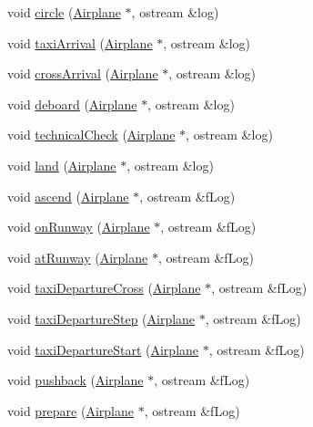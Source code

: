 \begin{DoxyCompactItemize}
\item 
void \hyperlink{classSystem_ad9eb38b77b90b0c42e18ee11d4e3b5f5}{circle} (\hyperlink{classAirplane}{Airplane} $\ast$, ostream \&log)
\item 
void \hyperlink{classSystem_a317a2279de25d632c07d864e36bd6b23}{taxi\+Arrival} (\hyperlink{classAirplane}{Airplane} $\ast$, ostream \&log)
\item 
void \hyperlink{classSystem_a26b7e33c42eaafd089f44cc37057e733}{cross\+Arrival} (\hyperlink{classAirplane}{Airplane} $\ast$, ostream \&log)
\item 
void \hyperlink{classSystem_ac9dbb8cb01b11e26732429ecfb15229a}{deboard} (\hyperlink{classAirplane}{Airplane} $\ast$, ostream \&log)
\item 
void \hyperlink{classSystem_a557889a54b170fa287156d2e7c7069dc}{technical\+Check} (\hyperlink{classAirplane}{Airplane} $\ast$, ostream \&log)
\item 
void \hyperlink{classSystem_a3524fb6d3f3065ec97a2c12ca521476e}{land} (\hyperlink{classAirplane}{Airplane} $\ast$, ostream \&log)
\item 
void \hyperlink{classSystem_abbd3230d357f0b897ff4d4f02774b93e}{ascend} (\hyperlink{classAirplane}{Airplane} $\ast$, ostream \&f\+Log)
\item 
void \hyperlink{classSystem_a0c208fdb58a50616cbb8a4dddff428a4}{on\+Runway} (\hyperlink{classAirplane}{Airplane} $\ast$, ostream \&f\+Log)
\item 
void \hyperlink{classSystem_a22dbdbc5b3de80899f08d76fb5afee41}{at\+Runway} (\hyperlink{classAirplane}{Airplane} $\ast$, ostream \&f\+Log)
\item 
void \hyperlink{classSystem_acfbbb087336c9be6c5d3bff48bf990c0}{taxi\+Departure\+Cross} (\hyperlink{classAirplane}{Airplane} $\ast$, ostream \&f\+Log)
\item 
void \hyperlink{classSystem_a90a664dab1f135035f77bb630e5336d0}{taxi\+Departure\+Step} (\hyperlink{classAirplane}{Airplane} $\ast$, ostream \&f\+Log)
\item 
void \hyperlink{classSystem_ad00d2b047b6b3a93681b37045c4f2142}{taxi\+Departure\+Start} (\hyperlink{classAirplane}{Airplane} $\ast$, ostream \&f\+Log)
\item 
void \hyperlink{classSystem_aaf7ec97fc1f23a7aa506fd44581e0f48}{pushback} (\hyperlink{classAirplane}{Airplane} $\ast$, ostream \&f\+Log)
\item 
void \hyperlink{classSystem_a74fc45ac036c70cc5afe021429aa5878}{prepare} (\hyperlink{classAirplane}{Airplane} $\ast$, ostream \&f\+Log)
\item 

\end{DoxyCompactItemize}
